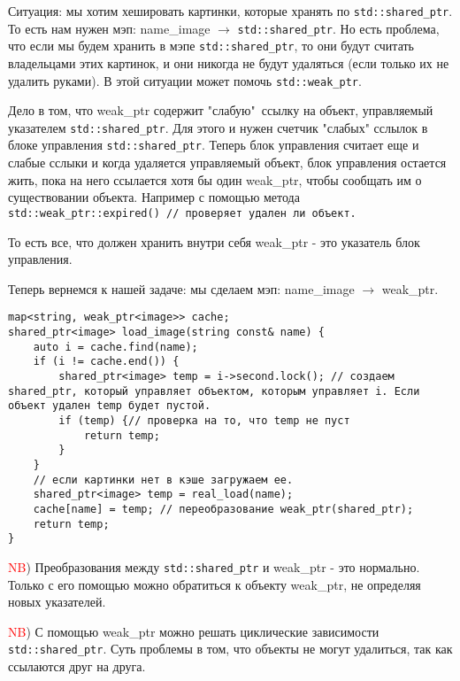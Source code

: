 Ситуация: мы хотим хешировать картинки, которые хранять по \texttt{std::shared_ptr}. То есть нам нужен мэп: name\_image $\to$ \texttt{std::shared_ptr}. Но есть проблема, что если мы будем хранить в мэпе \texttt{std::shared_ptr}, то они будут считать владельцами этих картинок, и они никогда не будут удаляться (если только их не удалить руками). В этой ситуации может помочь \texttt{std::weak_ptr}.


Дело в том, что weak\_ptr содержит "слабую"\ ссылку на объект, управляемый указателем \texttt{std::shared_ptr}. Для этого и нужен счетчик "слабых" сслылок в блоке управления \texttt{std::shared_ptr}. Теперь блок управления считает еще и слабые сслыки и когда удаляется управляемый объект, блок управления остается жить, пока на него ссылается хотя бы один weak\_ptr, чтобы сообщать им о существовании объекта. Например с помощью метода \texttt{std::weak_ptr::expired() // проверяет удален ли объект.}


То есть все, что должен хранить внутри себя weak\_ptr - это указатель блок управления.


Теперь вернемся к нашей задаче: мы сделаем мэп: name\_image $\to$ weak\_ptr.
\begin{verbatim}
map<string, weak_ptr<image>> cache;
shared_ptr<image> load_image(string const& name) {
    auto i = cache.find(name);
    if (i != cache.end()) {
        shared_ptr<image> temp = i->second.lock(); // создаем shared_ptr, который управляет объектом, которым управляет i. Если объект удален temp будет пустой.
        if (temp) {// проверка на то, что temp не пуст
            return temp;
        }
    }
    // если картинки нет в кэше загружаем ее.
    shared_ptr<image> temp = real_load(name);
    cache[name] = temp; // переобразование weak_ptr(shared_ptr);
    return temp;
}

\end{verbatim}


\textcolor{red}{NB}) Преобразования между \texttt{std::shared_ptr} и weak\_ptr - это нормально. Только с его помощью можно обратиться к объекту weak\_ptr, не определяя новых указателей.


\textcolor{red}{NB}) С помощью weak\_ptr можно решать циклические зависимости \texttt{std::shared_ptr}. Суть проблемы в том, что объекты не могут удалиться, так как ссылаются друг на друга.

